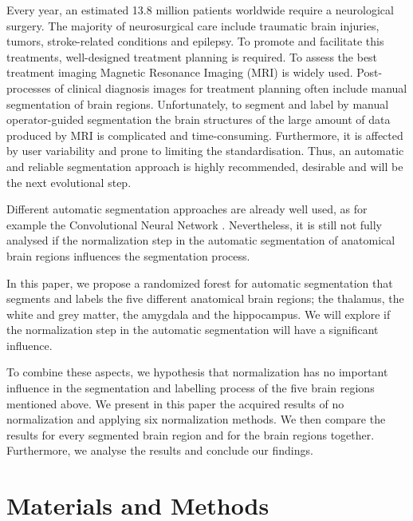 \documentclass[journal]{IEEEtran}
\begin{document}
	Every year, an estimated 13.8 million patients worldwide require a neurological surgery. The majority of neurosurgical care include traumatic brain injuries, tumors, stroke-related conditions and epilepsy. \cite{Dewan2019}
	To promote and facilitate this treatments, well-designed treatment planning is required.
	To assess the best treatment imaging Magnetic Resonance Imaging (MRI) is widely used. 
	Post-processes of clinical diagnosis images for treatment planning often include manual segmentation of brain regions. 
	Unfortunately, to segment and label by manual operator-guided segmentation the brain structures of the large amount of data produced by MRI is complicated and time-consuming. 
	Furthermore, it is affected by user variability and prone to limiting the standardisation. 
	Thus, an automatic and reliable segmentation approach is highly recommended, desirable and will be the next evolutional step. \cite{Pereira2016} \cite{Brebisson2015}


	Different automatic segmentation approaches are already well used, as for example the Convolutional Neural Network \cite{Pereira2016}.
	Nevertheless, it is still not fully analysed if the normalization step in the automatic segmentation of anatomical brain regions influences the segmentation process.
	
	
	In this paper, we propose a randomized forest for automatic segmentation that segments and labels the five different anatomical brain regions; the thalamus, the white and grey matter, the amygdala and the hippocampus. We will explore if the normalization step in the automatic segmentation will have a significant influence. 
	
	
	To combine these aspects, we hypothesis that normalization has no important influence in the segmentation and labelling process of the five brain regions mentioned above. 
	We present in this paper the acquired results of no normalization and applying six normalization methods. 
	We then compare the results for every segmented brain region and for the brain regions together. 
	Furthermore, we analyse the results and conclude our findings. 



\section{Materials and Methods}
\end{document}
